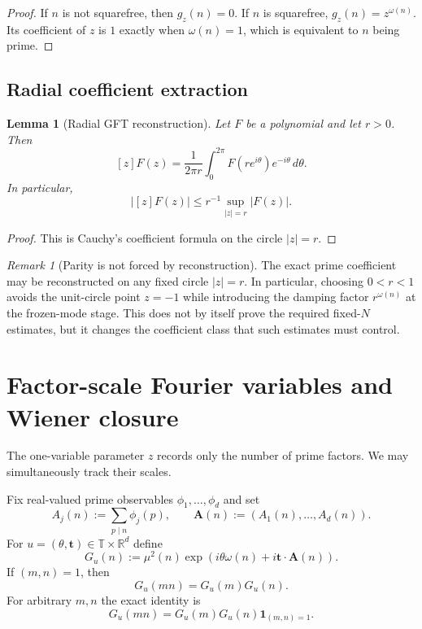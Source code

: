 \documentclass[11pt]{article}
\newtheorem{lemma}[theorem]{Lemma}
\theoremstyle{definition}
\theoremstyle{remark}
\newtheorem{remark}[theorem]{Remark}
\newcommand{\T}{\mathbb T}
\newcommand{\1}{\mathbf 1}
\begin{document}
\begin{proof}
If $n$ is not squarefree, then $g_z(n)=0$.  If $n$ is squarefree, $g_z(n)=z^{\omega(n)}$.  Its coefficient of $z$ is $1$ exactly when $\omega(n)=1$, which is equivalent to $n$ being prime.
\end{proof}

\subsection{Radial coefficient extraction}

\begin{lemma}[Radial GFT reconstruction]\label{lem:radial}
Let $F$ be a polynomial and let $r>0$.  Then
\begin{equation}\label{eq:radial}
[z]F(z)
=
\frac{1}{2\pi r}\int_0^{2\pi}
F(re^{i\theta})e^{-i\theta}\,d\theta.
\end{equation}
In particular,
\begin{equation}\label{eq:radial-sup}
|[z]F(z)|\le r^{-1}\sup_{|z|=r}|F(z)|.
\end{equation}
\end{lemma}

\begin{proof}
This is Cauchy's coefficient formula on the circle $|z|=r$.
\end{proof}

\begin{remark}[Parity is not forced by reconstruction]\label{rem:no-parity-circle}
The exact prime coefficient may be reconstructed on any fixed circle $|z|=r$.  In particular, choosing $0<r<1$ avoids the unit-circle point $z=-1$ while introducing the damping factor $r^{\omega(n)}$ at the frozen-mode stage.  This does not by itself prove the required fixed-$N$ estimates, but it changes the coefficient class that such estimates must control.
\end{remark}

\section{Factor-scale Fourier variables and Wiener closure}

The one-variable parameter $z$ records only the number of prime factors.  We may simultaneously track their scales.

Fix real-valued prime observables $\phi_1,\ldots,\phi_d$ and set
\begin{equation}\label{eq:Aj}
A_j(n):=\sum_{p\mid n}\phi_j(p),
\qquad
\bm A(n):=(A_1(n),\ldots,A_d(n)).
\end{equation}
For $u=(\theta,\bm t)\in\T\times\mathbb R^d$ define
\begin{equation}\label{eq:Gu}
G_u(n)
:=
\mu^2(n)
\exp\!\left(i\theta\omega(n)+i\bm t\cdot\bm A(n)\right).
\end{equation}
If $(m,n)=1$, then
\begin{equation}\label{eq:coprime-mult}
G_u(mn)=G_u(m)G_u(n).
\end{equation}
For arbitrary $m,n$ the exact identity is
\begin{equation}\label{eq:coprime-defect}
G_u(mn)=G_u(m)G_u(n)\1_{(m,n)=1}.
\end{equation}
\end{document}
